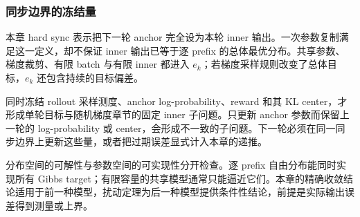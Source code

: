 \subsubsection{同步边界的冻结量}

本章 hard sync 表示把下一轮 anchor 完全设为本轮 inner 输出。一次参数复制满足这一定义，却不保证 inner 输出已等于逐 prefix 的总体最优分布。共享参数、梯度裁剪、有限 batch 与有限 inner 都进入 $e_k$；若梯度采样规则改变了总体目标，$e_k$ 还包含持续的目标偏差。

同时冻结 rollout 采样测度、anchor log-probability、reward 和其 KL center，才形成单轮目标与随机梯度章节的固定 inner 子问题。只更新 anchor 参数而保留上一轮的 log-probability 或 center，会形成不一致的子问题。下一轮必须在同一同步边界上更新这些量，或者把过期误差显式计入本章的递推。

分布空间的可解性与参数空间的可实现性分开检查。逐 prefix 自由分布能同时实现所有 Gibbs target；有限容量的共享模型通常只能逼近它们。本章的精确收敛结论适用于前一种模型，扰动定理为后一种模型提供条件性结论，前提是实际输出误差得到测量或上界。
